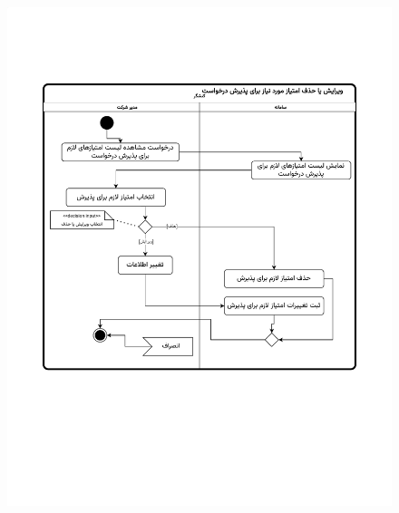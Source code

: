 \begin{figure}[ht!]
	\centering
	\includegraphics[scale=0.8, page=1]{figs/OOD-activity-editreqscore.pdf}
\end{figure}
\FloatBarrier
\newpage

